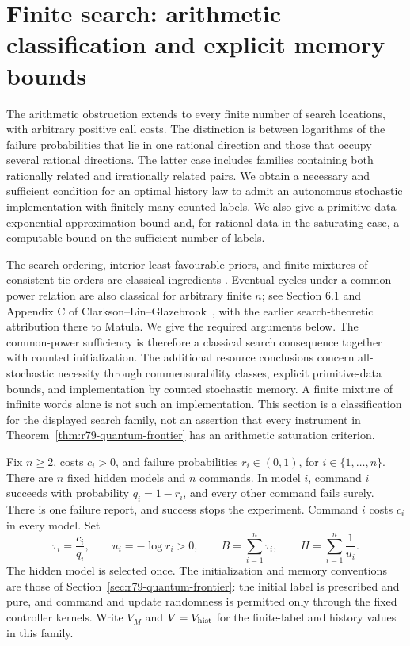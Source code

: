 \section{Finite search: arithmetic classification and explicit memory bounds}
\label{sec:r80-finite-search-saturation}

The arithmetic obstruction extends to every finite number of search
locations, with arbitrary positive call costs.  The distinction is
between logarithms of the failure probabilities that lie in one
rational direction and those that occupy several rational directions.
The latter case includes families containing both rationally related
and irrationally related pairs.  We obtain a necessary and sufficient
condition for an optimal history law to admit an autonomous stochastic
implementation with finitely many counted labels.  We also give a
primitive-data exponential approximation bound and, for rational data
in the saturating case, a computable bound on the sufficient number of
labels.

The search ordering, interior least-favourable priors, and finite
mixtures of consistent tie orders are classical ingredients
\cite{Matula1964,ClarksonLinGlazebrook2023,BuiLidbetterLin2023}.
Eventual cycles under a common-power relation are also classical for
arbitrary finite $n$; see Section 6.1 and Appendix C of
Clarkson--Lin--Glazebrook~\cite{ClarksonLinGlazebrook2023}, with the
earlier search-theoretic attribution there to Matula.  We give the
required arguments below.  The common-power sufficiency is therefore
a classical search consequence together with counted initialization.
The additional resource conclusions concern all-stochastic necessity
through commensurability classes, explicit primitive-data bounds, and
implementation by counted stochastic memory.  A finite mixture of
infinite words alone is not such an implementation.  This section is
a classification for the displayed search family, not an assertion
that every instrument in Theorem~\ref{thm:r79-quantum-frontier} has an
arithmetic saturation criterion.

Fix $n\ge2$, costs $c_i>0$, and failure probabilities $r_i\in(0,1)$,
for $i\in\{1,\ldots,n\}$.  There are $n$ fixed hidden models and $n$
commands.  In model $i$, command $i$ succeeds with probability
$q_i=1-r_i$, and every other command fails surely.  There is one failure
report, and success stops the experiment.  Command $i$ costs $c_i$ in
every model.  Set
\begin{equation}\label{eq:r80-finite-search-data}
 \tau_i=\frac{c_i}{q_i},\qquad u_i=-\log r_i>0,\qquad
 B=\sum_{i=1}^n\tau_i,\qquad H=\sum_{i=1}^n\frac1{u_i}.
\end{equation}
The hidden model is selected once.  The initialization and memory
conventions are those of Section~\ref{sec:r79-quantum-frontier}:
the initial label is prescribed and pure, and command and update
randomness is permitted only through the fixed controller kernels.
Write $V_M$ and $V=V_{\rm hist}$ for the finite-label and history
values in this family.

